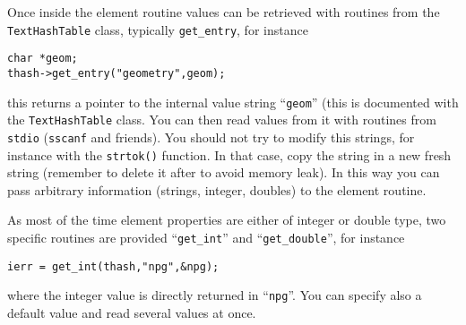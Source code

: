 \label{sec:getprop}

Once inside the element routine values can be
retrieved with routines from the \verb+TextHashTable+ class, typically
\verb+get_entry+, for instance
%
\begin{verbatim}
char *geom;
thash->get_entry("geometry",geom);
\end{verbatim}
%
this returns a pointer to the internal value string ``\verb+geom+''
(this is documented with the \verb+TextHashTable+ class. You can then
read values from it with routines from \verb+stdio+ (\verb+sscanf+ and
friends). You should not try to modify this strings, for instance with
the \verb+strtok()+ function.  
In that case, copy the string in a new fresh string (remember to
delete it after to avoid memory leak). In this way you can pass
arbitrary information (strings, integer, doubles) to the element
routine.


%
As most of the time element properties are either of integer or double
type, two specific routines are provided ``\verb+get_int+'' and
``\verb+get_double+'', for instance
%
\begin{verbatim}
ierr = get_int(thash,"npg",&npg); 
\end{verbatim}
%
where the integer value is directly returned in ``\verb+npg+''. You
can specify also a default value and read several values at once. 

\label{sec:per_elem_prop}   

